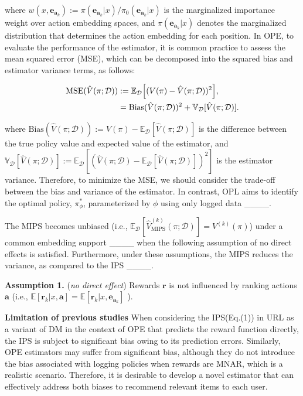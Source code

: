 where \( w(x, \boldsymbol{e}_{\boldsymbol{a}_k}) := \pi(\boldsymbol{e}_{\boldsymbol{a}_k}|x) / \pi_{0}(\boldsymbol{e}_{\boldsymbol{a}_k}|x) \) is the marginalized importance weight over action embedding spaces, and \( \pi(\boldsymbol{e}_{\boldsymbol{a}_k}|x) \) denotes the marginalized distribution that determines the action embedding for each position. In OPE, to evaluate the performance of the estimator, it is common practice to assess the mean squared error (MSE), which can be decomposed into the squared bias and estimator variance terms, as follows:

\vspace{-5mm}
\begin{align}
    \text{MSE}(\hat{V}(\pi;\mathcal{D})) &:= \mathbb{E}_{\mathcal{D}} \Big[(V(\pi) - \hat{V}(\pi;\mathcal{D}))^2 \Big], \\
    &= \text{Bias}(\hat{V}(\pi;\mathcal{D}))^2 + \mathbb{V}_{\mathcal{D}}[\hat{V}(\pi;\mathcal{D})]. \notag
\end{align}
\vspace{-5mm}

where \( \text{Bias}(\hat{V}(\pi;\mathcal{D})) := V(\pi) - \mathbb{E}_{\mathcal{D}}[\hat{V}(\pi;\mathcal{D})] \) is the difference between the true policy value and expected value of the estimator, and \( \mathbb{V}_{\mathcal{D}}[\hat{V}(\pi;\mathcal{D})] := \mathbb{E}_{\mathcal{D}}[(\hat{V}(\pi;\mathcal{D}) - \mathbb{E}_{\mathcal{D}}[\hat{V}(\pi;\mathcal{D})])^2] \) is the estimator variance. Therefore, to minimize the MSE, we should consider the trade-off between the bias and variance of the estimator. In contrast, OPL aims to identify the optimal policy, \( \pi_{\phi}^{*} \), parameterized by \( \phi \) using only logged data ____.

The MIPS becomes unbiased (i.e., \( \mathbb{E}_{\mathcal{D}}[\hat{V}^{(k)}_{\text{MIPS}}(\pi;\mathcal{D})] = V^{(k)}(\pi) \)) under a common embedding support ____ when the following assumption of no direct effects is satisfied. Furthermore, under these assumptions, the MIPS reduces the variance, as compared to the IPS ____.

\textbf{Assumption 1.} (\textit{no direct effect}) Rewards \( \boldsymbol{r} \) is not influenced by ranking actions \( \boldsymbol{a} \) (i.e., \( \mathbb{E}[\boldsymbol{r}_k|x,\boldsymbol{a}] = \mathbb{E}[\boldsymbol{r}_k|x,\boldsymbol{e}_{\boldsymbol{a}_k}] \) ).

\textbf{Limitation of previous studies} When considering the IPS(Eq.(1)) in URL as a variant of DM in the context of OPE that predicts the reward function directly, the IPS is subject to significant bias owing to its prediction errors. Similarly, OPE estimators may suffer from significant bias, although they do not introduce the bias associated with logging policies when rewards are MNAR, which is a realistic scenario. Therefore, it is desirable to develop a novel estimator that can effectively address both biases to recommend relevant items to each user.